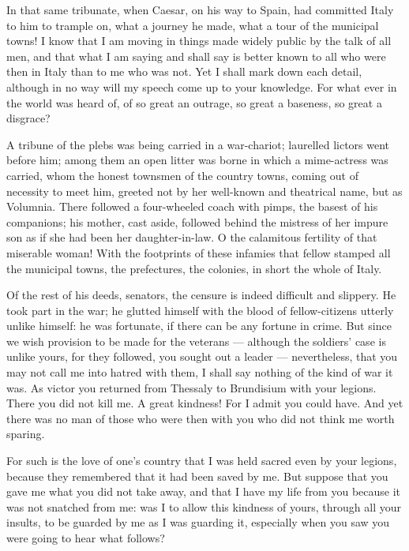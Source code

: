  In that same tribunate, when Caesar, on his way to Spain, had committed Italy to him to trample on, what a journey he made, what a tour of the municipal towns! I know that I am moving in things made widely public by the talk of all men, and that what I am saying and shall say is better known to all who were then in Italy than to me who was not. Yet I shall mark down each detail, although in no way will my speech come up to your knowledge. For what ever in the world was heard of, of so great an outrage, so great a baseness, so great a disgrace?

 A tribune of the plebs was being carried in a war-chariot; laurelled lictors went before him; among them an open litter was borne in which a mime-actress was carried, whom the honest townsmen of the country towns, coming out of necessity to meet him, greeted not by her well-known and theatrical name, but as Volumnia. There followed a four-wheeled coach with pimps, the basest of his companions; his mother, cast aside, followed behind the mistress of her impure son as if she had been her daughter-in-law. O the calamitous fertility of that miserable woman! With the footprints of these infamies that fellow stamped all the municipal towns, the prefectures, the colonies, in short the whole of Italy.

 Of the rest of his deeds, senators, the censure is indeed difficult and slippery. He took part in the war; he glutted himself with the blood of fellow-citizens utterly unlike himself: he was fortunate, if there can be any fortune in crime. But since we wish provision to be made for the veterans --- although the soldiers' case is unlike yours, for they followed, you sought out a leader --- nevertheless, that you may not call me into hatred with them, I shall say nothing of the kind of war it was. As victor you returned from Thessaly to Brundisium with your legions. There you did not kill me. A great kindness! For I admit you could have. And yet there was no man of those who were then with you who did not think me worth sparing.

 For such is the love of one's country that I was held sacred even by your legions, because they remembered that it had been saved by me. But suppose that you gave me what you did not take away, and that I have my life from you because it was not snatched from me: was I to allow this kindness of yours, through all your insults, to be guarded by me as I was guarding it, especially when you saw you were going to hear what follows?

